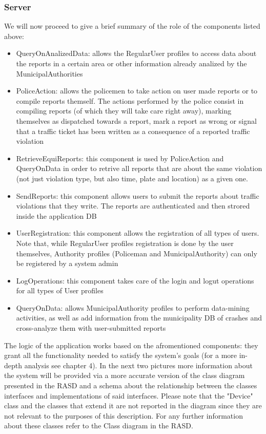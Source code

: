 \subsubsection{Server}
We will now proceed to give a brief summary of the role of the components listed above:
\begin{itemize}
\item QueryOnAnalizedData: allows the RegularUser profiles to access data about the reports in a certain area or other information already analized by the MunicipalAuthorities
\item PoliceAction: allows the policemen to take action on user made reports or to compile reports themself. The actions performed by the police consist in compiling reports (of which they will take care right away), marking themselves as dispatched towards a report, mark a report as wrong or signal that a traffic ticket has been written as a consequence of a reported traffic violation
\item RetrieveEquiReports: this component is used by PoliceAction and QueryOnData in order to retrive all reports that are about the same violation (not just violation type, but also time, plate and location) as a given one. 
\item SendReports: this component allows users to submit the reports about traffic violations that they write. The reports are authenticated and then strored inside the application DB
\item UserRegistration: this component allows the registration of all types of users. Note that, while RegularUser profiles registration is done by the user themselves, Authority profiles (Policeman and MunicipalAuthority) can only be registered by a system admin
\item LogOperations: this component takes care of the login and logut operations for all types of User profiles
\item QueryOnData: allows MunicipalAuthority profiles to perform data-mining activities,  as well as add information from the municipality DB of crashes and cross-analyze them with user-submitted reports
\end{itemize}
The logic of the application works based on the afromentioned components: they grant all the functionality needed to satisfy the system's goals (for a more in-depth analysis see chapter 4).
In the next two pictures more information about the system will be provided via a more accurate version of the class diagram presented in the RASD and a schema about the relationship between the classes interfaces and implementations of said interfaces. Please note that the "Device" class and the classes that extend it are not reported in the diagram since they are not relevant to the purposes of this description. For any further information about these classes refer to the Class diagram in the RASD.

